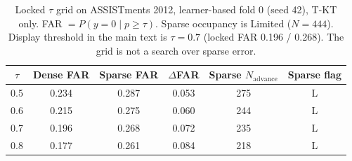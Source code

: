 \begin{table}[htbp]
\caption{Locked $\tau$ grid on ASSISTments 2012, learner-based fold 0 (seed 42), T-KT only. FAR $=P(y=0\mid p\ge\tau)$. Sparse occupancy is Limited ($N=444$). Display threshold in the main text is $\tau=0.7$ (locked FAR 0.196 / 0.268). The grid is not a search over sparse error.}
\label{tab:s3_tau_grid}
\centering
\small
\begin{tabular}{cccccc}
\toprule
$\tau$ & Dense FAR & Sparse FAR & $\Delta$FAR & Sparse $N_{\mathrm{advance}}$ & Sparse flag \\
\midrule
0.5 & 0.234 & 0.287 & 0.053 & 275 & L \\
0.6 & 0.215 & 0.275 & 0.060 & 244 & L \\
0.7 & 0.196 & 0.268 & 0.072 & 235 & L \\
0.8 & 0.177 & 0.261 & 0.084 & 218 & L \\
\bottomrule
\end{tabular}
\end{table}
